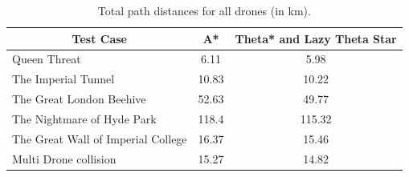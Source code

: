 \documentclass[a4paper,12pt,titlepage]{article}
\begin{document}
\begin{table}[!hbpt]
\centering
\begin{tabular}{|l|c|c|}
\hline
\multicolumn{1}{|c|}{Test Case} & A* & \multicolumn{1}{l|}{Theta* and Lazy Theta Star} \\ \hline
Queen Threat & 6.11 & 5.98 \\ \hline
The Imperial Tunnel & 10.83 & 10.22 \\ \hline
The Great London Beehive & 52.63 & 49.77 \\ \hline
The Nightmare of Hyde Park & 118.4 & 115.32 \\ \hline
The Great Wall of Imperial College & 16.37 & 15.46 \\ \hline
Multi Drone collision & 15.27 & 14.82 \\ \hline
\end{tabular}
\caption{Total path distances for all drones (in km). \cite{Balaji2017}}
\label{tab:aatc_total_drone_distance}
\end{table}
\end{document}
